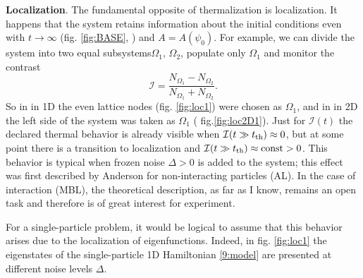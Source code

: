
\textbf{Localization}. The fundamental opposite of thermalization is localization. It happens that the system retains information about the initial conditions even with $t \to \infty$ (fig. \ref{fig:BASE}, ) and $A = A(\psi_0)$. For example, we can divide the system into two equal subsystems$\Omega_1,\, \Omega_2$, populate only $\Omega_1$ and monitor the contrast
\begin{equation*}
	\mathcal{I} = \frac{N_{\Omega_1}-N_{\Omega_2}}{N_{\Omega_1}+N_{\Omega_2}}.
\end{equation*}
So in \cite{schreiber_observation_2015} in 1D the even lattice nodes (fig. \ref{fig:loc1}) were chosen as $\Omega_1$, and in \cite{Choi_2016} in 2D the left side of the system was taken as $\Omega_1$ ( fig.\ref{fig:loc2D1}). Just for $\mathcal{I}(t)$ the declared thermal behavior is already visible when $\mathcal{I}(t \gg t_{\textnormal{th}}) \approx 0$, but at some point there is a transition to localization and $ \mathcal{I} (t \gg t_{\textnormal{th}}) \approx \textnormal{const} > 0$. This behavior is typical when frozen noise $\Delta > 0$ is added to the system; this effect was first described by Anderson \cite{PhysRev.109.1492} for non-interacting particles (AL). In the case of interaction (MBL), the theoretical description, as far as I know, remains an open task and therefore is of great interest for experiment.

For a single-particle problem, it would be logical to assume that this behavior arises due to the localization of eigenfunctions. Indeed, in fig. \ref{fig:loc1} the eigenstates of the single-particle 1D Hamiltonian \eqref{9:model} are presented at different noise levels $\Delta$.


